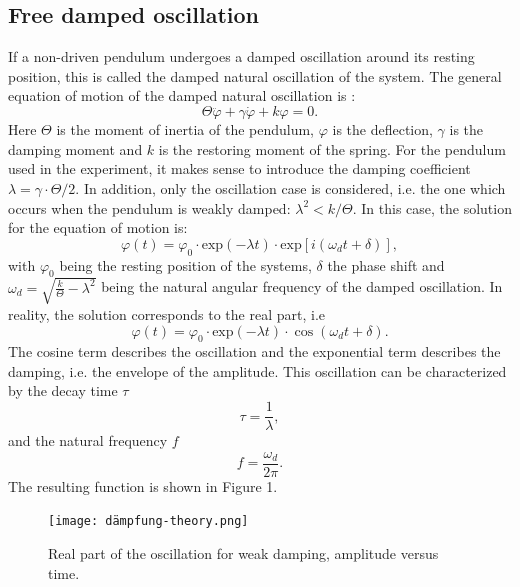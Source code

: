 \documentclass{article}
\begin{document}
\subsection{Free damped oscillation}
If a non-driven pendulum undergoes a damped oscillation around its resting position, this is called the damped natural oscillation of the system. The general equation of motion of the damped natural oscillation is \cite{1}:
\begin{equation}
    \Theta \ddot{\varphi}+\gamma \dot{\varphi} + k\varphi = 0.
\end{equation}
Here $\Theta$ is the moment of inertia of the pendulum, $\varphi$ is the deflection, $\gamma$ is the damping moment and $k$ is the restoring moment of the spring. For the pendulum used in the experiment, it makes sense to introduce the damping coefficient $\lambda = \gamma \cdot \Theta /2$. In addition, only the oscillation case is considered, i.e. the one which occurs when the pendulum is weakly damped: $\lambda^2 < k/\Theta$. In this case, the solution for the equation of motion is:
\begin{equation}
    \varphi(t)= \varphi_0 \cdot \textrm{exp}(-\lambda t) \cdot \textrm{exp}[i(\omega_d t + \delta)],
\end{equation}
with $\varphi_0$ being the resting position of the systems, $\delta$ the phase shift and $\omega_d = \sqrt{\frac{k}{\Theta}-\lambda^2}$ being the natural angular frequency of the damped oscillation. In reality, the solution corresponds to the real part, i.e
\begin{equation}
    \varphi(t)= \varphi_0 \cdot \textrm{exp}(-\lambda t) \cdot \cos(\omega_d t + \delta).
\end{equation}
The cosine term describes the oscillation and the exponential term describes the damping, i.e. the envelope of the amplitude. This oscillation can be characterized by the decay time $\tau$
\begin{equation}
    \tau = \frac{1}{\lambda},
\end{equation}
and the natural frequency $f$
\begin{equation}
    f = \frac{\omega_d}{2 \pi}.
\end{equation} 
The resulting function is shown in Figure 1.
\begin{figure}[hbt!]
\centering
\texttt{[image: dämpfung-theory.png]}
\caption{Real part of the oscillation for weak damping, amplitude versus time. \cite{1}}
\label{fig:length_eight_mouse}
\end{figure}
\end{document}
